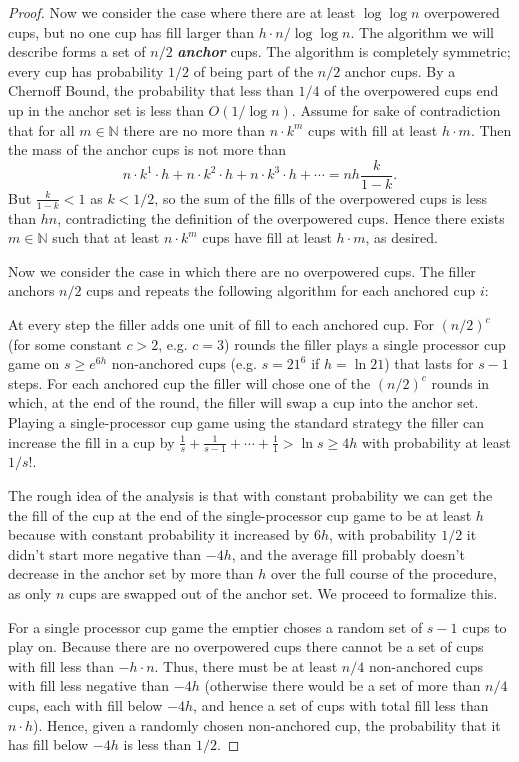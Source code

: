 \documentclass[twocolumn]{article}[11pt]
\newcommand{\defn}[1]{{\textit{\textbf{\boldmath #1}}}}
\begin{document}
\begin{proof}
  Now we consider the case where there are at least $\log\log n$ overpowered
  cups, but no one cup has fill larger than $h\cdot n / \log\log n$. The
  algorithm we will describe forms a set of $n/2$ \defn{anchor} cups. The
  algorithm is completely symmetric; every cup has probability $1/2$ of being
  part of the $n/2$ anchor cups. By a Chernoff Bound, the probability that less
  than $1/4$ of the overpowered cups end up in the anchor set is less than
  $O(1/\log n)$. Assume for sake of contradiction that for all $m \in
  \mathbb{N}$ there are no more than $n\cdot k^m$ cups with fill at least $h\cdot m$.
  Then the mass of the anchor cups is not more than
  $$n\cdot k^1 \cdot h+ n\cdot k^2 \cdot h+ n\cdot k^3 \cdot h+ \cdots = nh\frac{k}{1-k}.$$
  But $\frac{k}{1-k} < 1$ as $k < 1/2$, so the sum of the fills of the
  overpowered cups is less than $hn$, contradicting the definition of the
  overpowered cups. Hence there exists $m\in\mathbb{N}$ such that at least $n\cdot k^m$ cups
  have fill at least $h\cdot m$, as desired.

  Now we consider the case in which there are no overpowered cups.
  The filler anchors $n/2$ cups and repeats the following algorithm for each
  anchored cup $i$: 

  At every step the filler adds one unit of fill to each anchored cup. For
  $(n/2)^c$ (for some constant $c > 2$, e.g. $c=3$) rounds the filler plays a
  single processor cup game on $s\ge e^{6h}$ non-anchored cups (e.g. $s=21^6$
  if $h=\ln 21$) that lasts for $s-1$ steps. For each anchored cup the filler
  will chose one of the $(n/2)^c$ rounds in which, at the end of the round, the
  filler will swap a cup into the anchor set. Playing a
  single-processor cup game using the standard strategy the filler can increase
  the fill in a cup by $\frac{1}{s} + \frac{1}{s-1} + \cdots + \frac{1}{1} >
  \ln s \ge 4h$ with probability at least $1/s!$. 

  The rough idea of the analysis is that with constant probability we can get
  the the fill of the cup at the end of the single-processor cup game to be at
  least $h$ because with constant probability it increased by $6h$, with
  probability $1/2$ it didn't start more negative than $-4h$, and the average
  fill probably doesn't decrease in the anchor set by more than $h$ over the
  full course of the procedure, as only $n$ cups are swapped out of the anchor
  set. We proceed to formalize this.

  For a single processor cup game the emptier choses a random set of $s-1$ cups
  to play on. Because there are no overpowered cups there cannot be a set of
  cups with fill less than $-h\cdot n$. Thus, there must be at least $n/4$
  non-anchored cups with fill less negative than $-4h$ (otherwise there would be a set
  of more than $n/4$ cups, each with fill below $-4h$, and hence a set of cups
  with total fill less than $n\cdot h$). Hence, given a randomly chosen
  non-anchored cup, the probability that it has fill below $-4h$ is less than
  $1/2$.


\end{proof}
\end{document}
